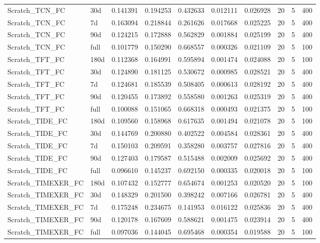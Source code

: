 \begin{tabular}{llrrrrrrrr}
Scratch\_TCN\_FC & 30d & 0.141391 & 0.194253 & 0.432633 & 0.012111 & 0.026928 & 20 & 5 & 400 \\
Scratch\_TCN\_FC & 7d & 0.163094 & 0.218844 & 0.261626 & 0.017668 & 0.025225 & 20 & 5 & 400 \\
Scratch\_TCN\_FC & 90d & 0.124215 & 0.172888 & 0.562829 & 0.001884 & 0.025199 & 20 & 5 & 400 \\
Scratch\_TCN\_FC & full & 0.101779 & 0.150290 & 0.668557 & 0.000326 & 0.021109 & 20 & 5 & 100 \\
Scratch\_TFT\_FC & 180d & 0.112368 & 0.164991 & 0.595894 & 0.001474 & 0.024088 & 20 & 5 & 100 \\
Scratch\_TFT\_FC & 30d & 0.124890 & 0.181125 & 0.530672 & 0.000985 & 0.028521 & 20 & 5 & 400 \\
Scratch\_TFT\_FC & 7d & 0.124681 & 0.185539 & 0.508405 & 0.000613 & 0.028192 & 20 & 5 & 400 \\
Scratch\_TFT\_FC & 90d & 0.120455 & 0.173892 & 0.558580 & 0.001263 & 0.025319 & 20 & 5 & 400 \\
Scratch\_TFT\_FC & full & 0.100088 & 0.151065 & 0.668318 & 0.000493 & 0.021375 & 20 & 5 & 100 \\
Scratch\_TIDE\_FC & 180d & 0.109560 & 0.158968 & 0.617635 & 0.001494 & 0.021078 & 20 & 5 & 100 \\
Scratch\_TIDE\_FC & 30d & 0.144769 & 0.200880 & 0.402522 & 0.004584 & 0.028361 & 20 & 5 & 400 \\
Scratch\_TIDE\_FC & 7d & 0.150103 & 0.209591 & 0.358280 & 0.003757 & 0.027816 & 20 & 5 & 400 \\
Scratch\_TIDE\_FC & 90d & 0.127403 & 0.179587 & 0.515488 & 0.002009 & 0.025692 & 20 & 5 & 400 \\
Scratch\_TIDE\_FC & full & 0.096610 & 0.145237 & 0.692150 & 0.000335 & 0.020018 & 20 & 5 & 100 \\
Scratch\_TIMEXER\_FC & 180d & 0.107432 & 0.152777 & 0.654674 & 0.001253 & 0.020520 & 20 & 5 & 100 \\
Scratch\_TIMEXER\_FC & 30d & 0.148329 & 0.201500 & 0.398242 & 0.007166 & 0.026781 & 20 & 5 & 400 \\
Scratch\_TIMEXER\_FC & 7d & 0.175248 & 0.234675 & 0.141953 & 0.016122 & 0.025836 & 20 & 5 & 400 \\
Scratch\_TIMEXER\_FC & 90d & 0.120178 & 0.167609 & 0.588621 & 0.001475 & 0.023914 & 20 & 5 & 400 \\
Scratch\_TIMEXER\_FC & full & 0.097036 & 0.144045 & 0.695468 & 0.000354 & 0.019588 & 20 & 5 & 100 \\

\end{tabular}
